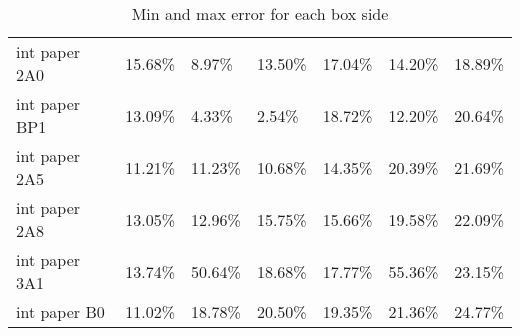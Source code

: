 \documentclass[11pt, twoside, reqno]{book}
\begin{document}
\begin{table}[]
\begin{tabular}{lllllll}
		int paper 2A0       & 15.68\%       & 8.97\%        & 13.50\%       & 17.04\%       & 14.20\%       & 18.89\%       \\
		int paper BP1       & 13.09\%       & 4.33\%        & 2.54\%        & 18.72\%       & 12.20\%       & 20.64\%       \\
		int paper 2A5       & 11.21\%       & 11.23\%       & 10.68\%       & 14.35\%       & 20.39\%       & 21.69\%       \\
		int paper 2A8       & 13.05\%       & 12.96\%       & 15.75\%       & 15.66\%       & 19.58\%       & 22.09\%       \\
		int paper 3A1       & 13.74\%       & 50.64\%       & 18.68\%       & 17.77\%       & 55.36\%       & 23.15\%       \\
		int paper B0        & 11.02\%       & 18.78\%       & 20.50\%       & 19.35\%       & 21.36\%       & 24.77\%      
	\end{tabular}
\caption{Min and max error for each box side}
\end{table}
\end{document}

